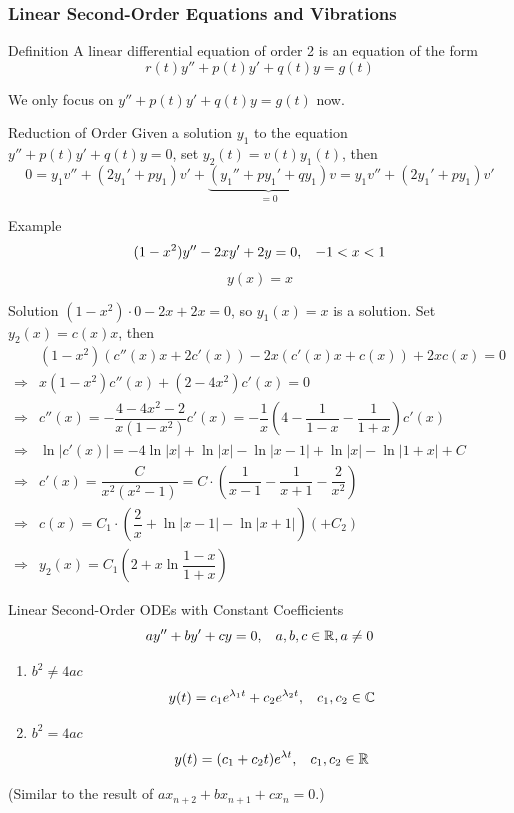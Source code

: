 \documentclass{beamer}
\begin{document}
\begin{frame}
\frametitle{Linear Second-Order Equations and Vibrations}
\begin{block}{Definition}
A linear differential equation of order 2 is an equation of the form
$$r(t)y''+p(t)y'+q(t)y=g(t)$$
\end{block}
We only focus on $y''+p(t)y'+q(t)y=g(t)$ now.
\end{frame}

\begin{frame}
\begin{block}{Reduction of Order}
Given a solution $y_1$ to the equation $y''+p(t)y'+q(t)y=0$, set $y_2(t)=v(t)y_1(t)$, then
$$0=y_1v''+(2y_1'+py_1)v'+\underbrace{(y_1''+py_1'+qy_1)}_{=0}v=y_1v''+(2y_1'+py_1)v'$$
\end{block}
\end{frame}

\begin{frame}
\begin{block}{Example}
$$(1-x^2)y''-2xy'+2y=0,\hspace{3mm}-1<x<1$$
$$y(x)=x$$
\end{block}
\end{frame}
\begin{frame}
\begin{block}{Solution}
$(1-x^2)\cdot 0-2x+2x=0$, so $y_1(x)=x$ is a solution. Set $y_2(x)=c(x)x$, then
\begin{align*}
&(1-x^2)(c''(x)x+2c'(x))-2x(c'(x)x+c(x))+2xc(x)=0\\
\Rightarrow&x(1-x^2)c''(x)+(2-4x^2)c'(x)=0\\
\Rightarrow&c''(x)=-\dfrac{4-4x^2-2}{x(1-x^2)}c'(x)=-\dfrac{1}{x}(4-\dfrac{1}{1-x}-\dfrac{1}{1+x})c'(x)\\
\Rightarrow&\ln |c'(x)|=-4\ln |x|+\ln |x|-\ln|x-1|+\ln |x|-\ln|1+x|+C\\
\Rightarrow& c'(x)=\dfrac{C}{x^2(x^2-1)}=C\cdot(\dfrac{1}{x-1}-\dfrac{1}{x+1}-\dfrac{2}{x^2})\\
\Rightarrow&c(x)=C_1\cdot(\dfrac{2}{x}+\ln|x-1|-\ln|x+1|)(+C_2)\\
\Rightarrow&y_2(x)=C_1(2+x\ln\dfrac{1-x}{1+x})
\end{align*}
 
\end{block}
\end{frame}

\begin{frame}
\begin{block}{Linear Second-Order ODEs with Constant Coefficients}
$$ay''+by'+cy=0,\hspace{3mm}a,b,c\in\mathbb{R},a\neq0$$
\begin{enumerate}
\item $b^2\neq4ac$
$$y(t)=c_1e^{\lambda_1t}+c_2e^{\lambda_2t},\hspace{3mm}c_1,c_2\in\mathbb{C}$$
\item $b^2=4ac$
$$y(t)=(c_1+c_2t)e^{\lambda t},\hspace{3mm}c_1,c_2\in\mathbb{R}$$
\end{enumerate}
(Similar to the result of $ax_{n+2}+bx_{n+1}+cx_n=0$.)
\end{block}
\end{frame}
\end{document}

